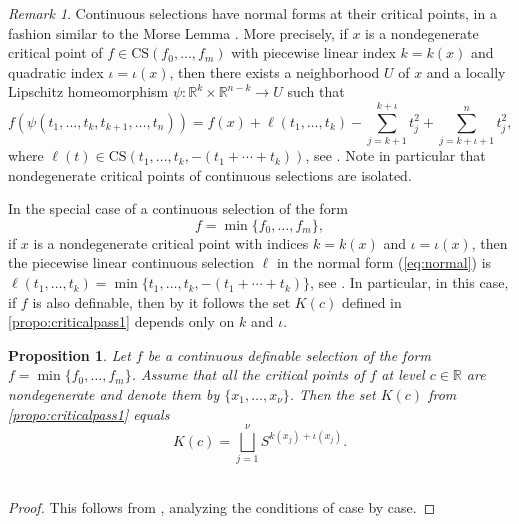 \documentclass{amsart}
\newcommand{\R}{\mathbb{R}}
\def\lini{k}
\def\quadi{\iota}
\newtheorem{proposition}[subsubsection]{Proposition}
\theoremstyle{definition}
\theoremstyle{remark}
\newtheorem{remark}[subsubsection]{Remark}
\newcommand{\be}{\begin{equation}}
\newcommand{\ee}{\end{equation}}
\begin{document}
\begin{remark}
\label{rmk:normalformdist1}
Continuous selections have normal forms at their critical points, in a fashion similar to the Morse Lemma \cite[Lemma~2.2]{milnor1963morse}. More precisely, if $x$ is a nondegenerate critical point of $f\in \mathrm{CS}(f_0, \ldots, f_m)$ with piecewise linear index $\lini = \lini(x)$ and quadratic index $\quadi = \quadi(x)$, then there exists a neighborhood $U$ of $x$ and a locally Lipschitz homeomorphism $\psi\colon\R^\lini \times \R^{n - \lini} \to U$ such that
\be
\label{eq:normal}
f(\psi(t_1, \ldots, t_\lini, t_{\lini+1}, \ldots, t_{n}))=f(x)+\ell(t_1, \ldots, t_\lini)-\sum_{j=\lini+1}^{\lini + \quadi} t_{j}^2 + \sum_{j = \lini + \quadi + 1}^n t_j^2,
\ee
where $\ell(t) \in \mathrm{CS}(t_1, \ldots, t_\lini, -(t_1 + \cdots + t_\lini))$, see \cite[Theorem 3.3]{JongenPallaschke1988}. Note in particular that nondegenerate critical points of continuous selections are isolated.
\end{remark}

In the special case of a continuous selection of the form $$f=\min\{f_0, \ldots, f_m\},$$ if $x$ is a nondegenerate critical point with indices $\lini = \lini(x)$ and $\quadi = \quadi(x)$, then 
the piecewise linear continuous selection $\ell$ in the normal form  (\ref{eq:normal}) is $\ell(t_1, \ldots, t_\lini) = \min \{ t_1, \ldots, t_\lini, -(t_1 + \cdots + t_\lini)\}$, see \cite[Theorem~3.3]{JongenPallaschke1988}.
In particular, in this case, if $f$ is also definable, then by \cite[Sect.~4]{APS1997} it follows the set $K(c)$ defined in \cref{propo:criticalpass1} depends only on $\lini$ and $\quadi$.

\begin{proposition}
\label{propo:passmin}
Let $f$ be a continuous definable selection of the form $f=\min\{f_0, \ldots, f_m\}$. Assume that all the critical points of $f$ at level $c\in \R$ are nondegenerate and denote them by $\{x_1, \ldots, x_\nu\}$. Then the set $K(c)$ from \cref{propo:criticalpass1} equals
$$K(c) = \bigsqcup_{j=1}^\nu S^{\lini(x_j) + \quadi(x_j)}.$$\
\end{proposition}
\begin{proof}This follows from \cite[Sect.~4]{APS1997}, analyzing the conditions of \cite[Theorem 4.2]{APS1997} case by case.
\end{proof}
\end{document}
